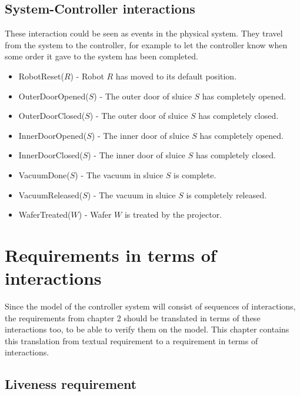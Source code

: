 \documentclass[12pt]{report}
\begin{document}
	\section{System-Controller interactions}
	These interaction could be seen as events in the physical system. They travel from the system to the controller, for example to let the controller know when some order it gave to the system has been completed.
	\begin{itemize}
\item RobotReset($R$) - Robot $R$ has moved to its default position.
\item OuterDoorOpened($S$) - The outer door of sluice $S$ has completely opened.
\item OuterDoorClosed($S$) - The outer door of sluice $S$ has completely closed.
\item InnerDoorOpened($S$) - The inner door of sluice $S$ has completely opened.
\item InnerDoorClosed($S$) - The inner door of sluice $S$ has completely closed.
\item VacuumDone($S$) - The vacuum in sluice $S$ is complete.
\item VacuumReleased($S$) - The vacuum in sluice $S$ is completely released.
\item WaferTreated($W$) - Wafer $W$ is treated by the projector.
	\end{itemize}
	
	\chapter{Requirements in terms of interactions}

	Since the model of the controller system will consist of sequences of interactions, the requirements from chapter 2 should be translated in terms of these interactions too, to be able to verify them on the model. This chapter contains this translation from textual requirement to a requirement in terms of interactions.
	\section{Liveness requirement}
	\begin{itemize}
	\end{itemize}
\end{document}
